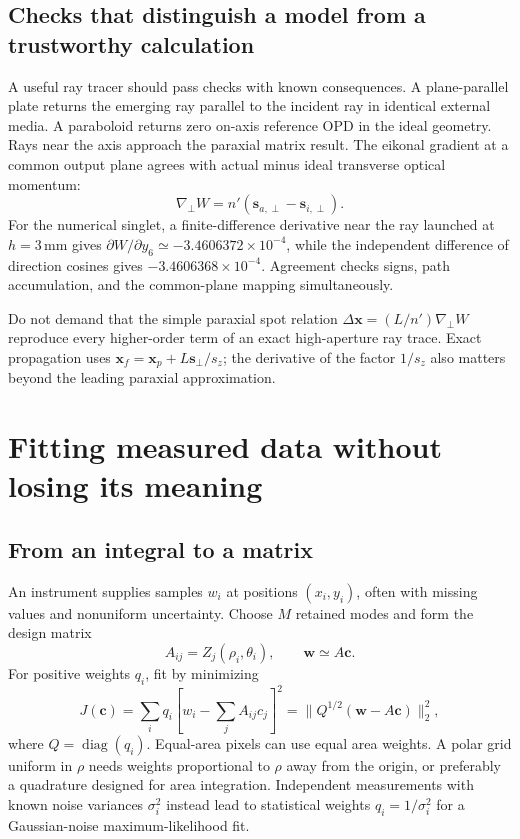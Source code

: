 \section{Checks that distinguish a model from a trustworthy calculation}
A useful ray tracer should pass checks with known consequences. A
plane-parallel plate returns the emerging ray parallel to the incident
ray in identical external media. A paraboloid returns zero on-axis
reference OPD in the ideal geometry. Rays near the axis approach the
paraxial matrix result. The eikonal gradient at a common output plane
agrees with actual minus ideal transverse optical momentum:
\begin{equation}
 \nabla_{\perp}W=n'(\bm s_{a,\perp}-\bm s_{i,\perp}).
\end{equation}
For the numerical singlet, a finite-difference derivative near the
ray launched at $h=3\,\mathrm{mm}$ gives
$\partial W/\partial y_6\simeq-3.4606372\times10^{-4}$, while the
independent difference of direction cosines gives
$-3.4606368\times10^{-4}$. Agreement checks signs, path accumulation,
and the common-plane mapping simultaneously.

Do not demand that the simple paraxial spot relation
$\Delta\bm x=(L/n')\nabla_\perp W$ reproduce every higher-order term
of an exact high-aperture ray trace. Exact propagation uses
$\bm x_f=\bm x_p+L\bm s_\perp/s_z$; the derivative of the factor
$1/s_z$ also matters beyond the leading paraxial approximation.

\chapter{Fitting measured data without losing its meaning}
\label{zc:fitting}

\section{From an integral to a matrix}
An instrument supplies samples $w_i$ at positions $(x_i,y_i)$, often
with missing values and nonuniform uncertainty. Choose $M$ retained
modes and form the design matrix
\begin{equation}
 A_{ij}=Z_j(\rho_i,\theta_i),\qquad
 \bm w\simeq A\bm c.
\end{equation}
For positive weights $q_i$, fit by minimizing
\begin{equation}
 J(\bm c)=\sum_iq_i\left[w_i-\sum_jA_{ij}c_j\right]^2
         =\lVert Q^{1/2}(\bm w-A\bm c)\rVert_2^2,
 \label{zc:weightedfit}
\end{equation}
where $Q=\operatorname{diag}(q_i)$. Equal-area pixels can use equal
area weights. A polar grid uniform in $\rho$ needs weights proportional
to $\rho$ away from the origin, or preferably a quadrature designed
for area integration. Independent measurements with known noise
variances $\sigma_i^2$ instead lead to statistical weights
$q_i=1/\sigma_i^2$ for a Gaussian-noise maximum-likelihood fit.


